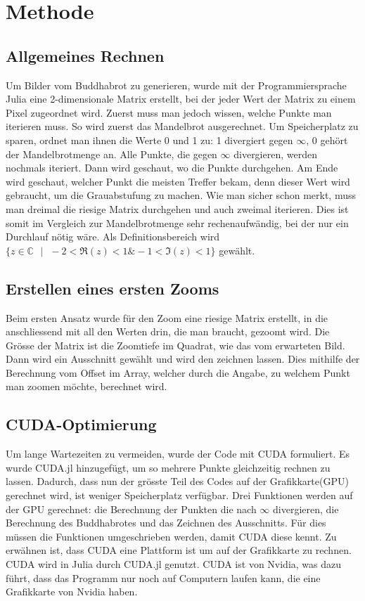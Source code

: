 \section{Methode}
\subsection{Allgemeines Rechnen}
Um Bilder vom Buddhabrot zu generieren, wurde mit der Programmiersprache Julia eine 2-dimensionale Matrix erstellt, bei der jeder Wert der Matrix zu einem Pixel zugeordnet wird. Zuerst muss man jedoch wissen, welche Punkte man iterieren muss. So wird zuerst das Mandelbrot ausgerechnet. Um Speicherplatz zu sparen, ordnet man ihnen die Werte 0 und 1 zu: 1 divergiert gegen $\infty$, 0 gehört der Mandelbrotmenge an. Alle Punkte, die gegen $\infty$ divergieren, werden nochmals iteriert. Dann wird geschaut, wo die Punkte durchgehen. Am Ende wird geschaut, welcher Punkt die meisten Treffer bekam, denn dieser Wert wird gebraucht, um die Grauabstufung zu machen. Wie man sicher schon merkt, muss man dreimal die riesige Matrix durchgehen und auch zweimal iterieren. Dies ist somit im Vergleich zur Mandelbrotmenge sehr rechenaufwändig, bei der nur ein Durchlauf nötig wäre. Als Definitionsbereich wird $\{z \in \mathbb{C}\text{ }|\text{ }-2 < \Re(z) < 1 \& -1 < \Im(z) < 1\}$ gewählt.
\subsection{Erstellen eines ersten Zooms}
Beim ersten Ansatz wurde für den Zoom eine riesige Matrix erstellt, in die anschliessend mit all den Werten drin, die man braucht, gezoomt wird. Die Grösse der Matrix ist die Zoomtiefe im Quadrat, wie das vom erwarteten Bild. Dann wird ein Ausschnitt gewählt und wird den zeichnen lassen. Dies mithilfe der Berechnung vom Offset im Array, welcher durch die Angabe, zu welchem Punkt man zoomen möchte, berechnet wird.
\subsection{CUDA-Optimierung}
Um lange Wartezeiten zu vermeiden, wurde der Code mit CUDA formuliert. Es wurde CUDA.jl hinzugefügt, um so mehrere Punkte gleichzeitig rechnen zu lassen. Dadurch, dass nun der grösste Teil des Codes auf der Grafikkarte(GPU) gerechnet wird, ist weniger Speicherplatz verfügbar. Drei Funktionen werden auf der GPU gerechnet: die Berechnung der Punkten die nach $\infty$ divergieren, die Berechnung des Buddhabrotes und das Zeichnen des Ausschnitts. Für dies müssen die Funktionen umgeschrieben werden, damit CUDA diese kennt. Zu erwähnen ist, dass CUDA eine Plattform ist um auf der Grafikkarte zu rechnen. CUDA wird in Julia durch CUDA.jl genutzt. CUDA ist von Nvidia, was dazu führt, dass das Programm nur noch auf Computern laufen kann, die eine Grafikkarte von Nvidia haben.
